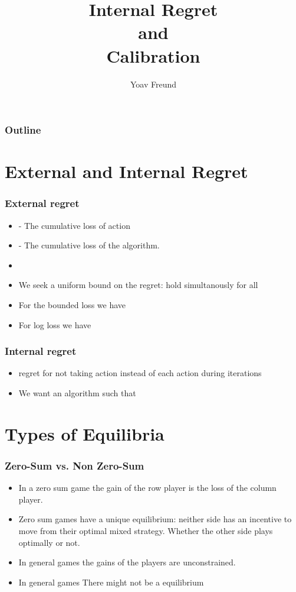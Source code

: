 \documentclass[handout]{beamer}
\title[Internal Regret and Calibration]%
{Internal Regret \\ and \\ Calibration}
\author[Freund] %
{Yoav Freund}
\institute[Universities of Somewhere and Elsewhere] %
\begin{document}

\begin{frame}
  \titlepage
\end{frame}

\begin{frame}
  \frametitle{Outline}
  \tableofcontents[pausesections]
\end{frame}

\section{External and Internal Regret}

\begin{frame}
\frametitle{External regret}
\begin{itemize}
\item {} - The cumulative loss of action 
\item {} - The cumulative loss of the algorithm.
\item {} 
\item We seek a uniform bound on the regret: hold simultanously for
  all 
\item For the bounded loss  we have 
\item For log loss we have 
\end{itemize}
\end{frame}

\begin{frame}
\frametitle{Internal regret}
\begin{itemize}
\item {} regret for not taking action  instead of
  each action  during iterations 
\item We want an algorithm such that 
\end{itemize}
\end{frame}

\section{Types of Equilibria}

\begin{frame}
\frametitle{Zero-Sum vs. Non Zero-Sum}
\begin{itemize}
\item In a zero sum game the gain of the row player is the loss of the
  column player.
\item Zero sum games have a unique  equilibrium: neither side
  has an incentive to move from their optimal mixed strategy. Whether
  the other side plays optimally or not.
\item In general games the gains of the players are
  unconstrained.
\item In general games There might not be a  equilibrium 
\end{itemize}
\end{frame}
\end{document}
